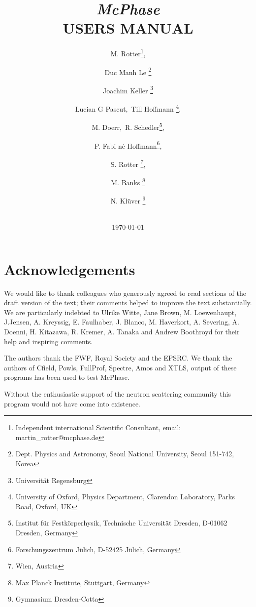 \documentclass[twoside]{article}
\begin{document}
 \title{ {\Huge \bf \em McPhase} \\
 \vspace{1cm} 
{\bf   USERS MANUAL}\\
  \vspace{2cm} 
\vspace{3cm}}

\date {\vspace{2cm} 
 \vspace{2cm}
 \\ \today}

\author{M. Rotter\thanks{Independent international Scientific Consultant, email: martin\_rotter@mcphase.de}, \and
Duc Manh Le \thanks{Dept. Physics and Astronomy, Seoul National University, Seoul 151-742, Korea}
\and Joachim Keller \thanks{Universit\"at Regensburg}
\and Lucian G Pascut,~Till Hoffmann 
\thanks{University of Oxford, Physics Department, Clarendon Laboratory, Parks Road, Oxford, UK},
\and
 M. Doerr,~R. Schedler\thanks{Institut f\"ur Festk\"orperhysik, Technische Universit\"at Dresden, D-01062 Dresden, Germany},
\and
P. Fabi n\'e Hoffmann\thanks{Forschungszentrum J\"ulich, D-52425 J\"ulich, Germany},
\and S. Rotter \thanks{Wien, Austria},
\and M. Banks \thanks{Max Planck Institute, Stuttgart, Germany}
\and N. Kl\"uver \thanks{Gymnasium Dresden-Cotta}
}


\maketitle
\clearpage

\section*{Acknowledgements}

We would like to thank colleagues who generously agreed to read sections of the draft version
of the text; their comments helped to improve the text substantially. We are particularly indebted to
Ulrike Witte, Jane Brown, M. Loewenhaupt, J.Jensen, A. Kreyssig, E. Faulhaber,
J. Blanco, M. Haverkort, A. Severing,
A. Doenni, H. Kitazawa, R. Kremer, A. Tanaka 
 and Andrew Boothroyd for their help and inspiring comments.

The authors thank the FWF, Royal Society and the EPSRC.
We thank the authors of Cfield, Powls, FullProf, Spectre, Amos and XTLS, output 
of these programs has been used to test McPhase. 

Without the enthusiastic support of the neutron scattering 
community this program would not have come into existence. 
\end{document}
